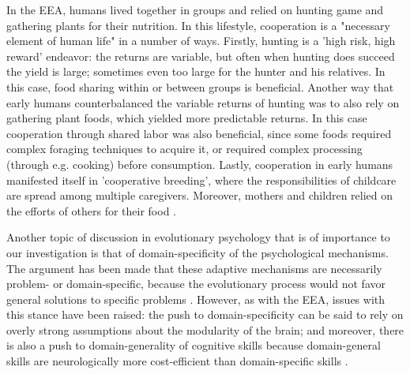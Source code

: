 In the EEA, humans lived together in groups and relied on hunting game and gathering plants for their nutrition.
In this lifestyle, cooperation is a "necessary element of human life" \citep[p.~R448]{ApicellaSilk19} in a number of ways. Firstly, hunting is a 'high risk, high reward' endeavor: the returns are variable, but often when hunting does succeed the yield is large; sometimes even too large for the hunter and his relatives. In this case, food sharing within or between groups is beneficial.
Another way that early humans counterbalanced the variable returns of hunting was to also rely on gathering plant foods, which yielded more predictable returns. In this case cooperation through shared labor was also beneficial, since some foods required complex foraging techniques to acquire it, or required complex processing (through e.g. cooking) before consumption.
Lastly, cooperation in early humans manifested itself in 'cooperative breeding', where the responsibilities of childcare are spread among multiple caregivers. Moreover, mothers and children relied on the efforts of others for their food \citep{ApicellaSilk19}.

Another topic of discussion in evolutionary psychology that is of importance to our investigation is that of domain-specificity of the psychological mechanisms. The argument has been made that these adaptive mechanisms are necessarily problem- or domain-specific, because the evolutionary process would not favor general solutions to specific problems \citep[p.~50]{Buss15}.
However, as with the EEA, issues with this stance have been raised: the push to domain-specificity can be said to rely on overly strong assumptions about the modularity of the brain; and moreover, there is also a push to domain-generality of cognitive skills because domain-general skills are neurologically more cost-efficient than domain-specific skills \citep{LB02}.

